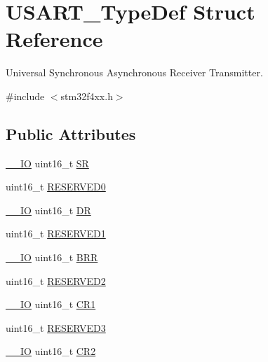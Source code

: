 \hypertarget{struct_u_s_a_r_t___type_def}{}\section{U\+S\+A\+R\+T\+\_\+\+Type\+Def Struct Reference}
\label{struct_u_s_a_r_t___type_def}


Universal Synchronous Asynchronous Receiver Transmitter.  




{\ttfamily \#include $<$stm32f4xx.\+h$>$}

\subsection*{Public Attributes}
\begin{DoxyCompactItemize}
\item 
\hyperlink{core__cm4_8h_aec43007d9998a0a0e01faede4133d6be}{\+\_\+\+\_\+\+IO} uint16\+\_\+t \hyperlink{struct_u_s_a_r_t___type_def_a3f1fd9f0c004d3087caeba4815faa41c}{SR}
\item 
uint16\+\_\+t \hyperlink{struct_u_s_a_r_t___type_def_a84ccd64c74c8dbc78b94172ce759de10}{R\+E\+S\+E\+R\+V\+E\+D0}
\item 
\hyperlink{core__cm4_8h_aec43007d9998a0a0e01faede4133d6be}{\+\_\+\+\_\+\+IO} uint16\+\_\+t \hyperlink{struct_u_s_a_r_t___type_def_accee34aaec89aad4aeef512bba173ae5}{DR}
\item 
uint16\+\_\+t \hyperlink{struct_u_s_a_r_t___type_def_a6d78680272a465db0ee43eba4e9c54f3}{R\+E\+S\+E\+R\+V\+E\+D1}
\item 
\hyperlink{core__cm4_8h_aec43007d9998a0a0e01faede4133d6be}{\+\_\+\+\_\+\+IO} uint16\+\_\+t \hyperlink{struct_u_s_a_r_t___type_def_a2044eb2a0a8a731400d309741bceb2f7}{B\+RR}
\item 
uint16\+\_\+t \hyperlink{struct_u_s_a_r_t___type_def_af2b7924854e56d0ebd3e8699dfd0e369}{R\+E\+S\+E\+R\+V\+E\+D2}
\item 
\hyperlink{core__cm4_8h_aec43007d9998a0a0e01faede4133d6be}{\+\_\+\+\_\+\+IO} uint16\+\_\+t \hyperlink{struct_u_s_a_r_t___type_def_a5de50313b1437f7f926093f00902d37a}{C\+R1}
\item 
uint16\+\_\+t \hyperlink{struct_u_s_a_r_t___type_def_a158066c974911c14efd7ea492ea31137}{R\+E\+S\+E\+R\+V\+E\+D3}
\item 
\hyperlink{core__cm4_8h_aec43007d9998a0a0e01faede4133d6be}{\+\_\+\+\_\+\+IO} uint16\+\_\+t \hyperlink{struct_u_s_a_r_t___type_def_a2a494156d185762e4596696796c393bc}{C\+R2}

\end{DoxyCompactItemize}
